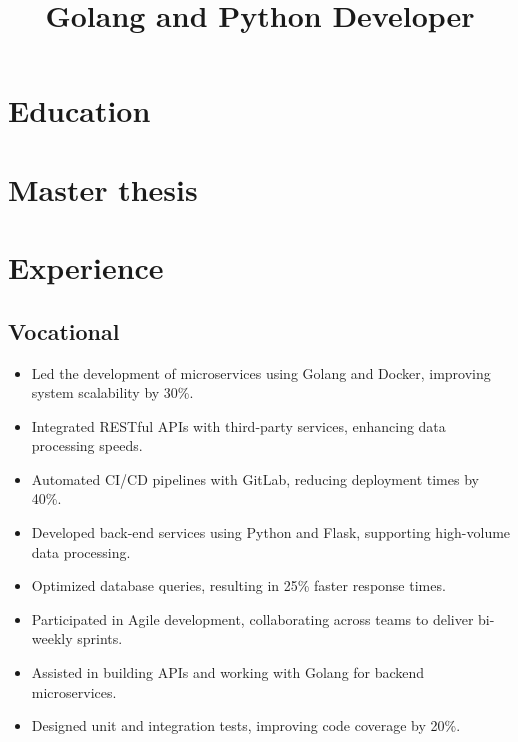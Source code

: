 \documentclass[11pt,a4paper,sans]{moderncv}
\title{Golang and Python Developer}
\begin{document}
\makecvtitle

\section{Education}

\section{Master thesis}

\section{Experience}
\subsection{Vocational}
{
\begin{itemize}
\item Led the development of microservices using Golang and Docker, improving system scalability by 30\%.
\item Integrated RESTful APIs with third-party services, enhancing data processing speeds.
\item Automated CI/CD pipelines with GitLab, reducing deployment times by 40\%.
\end{itemize}}

{
\begin{itemize}
\item Developed back-end services using Python and Flask, supporting high-volume data processing.
\item Optimized database queries, resulting in 25\% faster response times.
\item Participated in Agile development, collaborating across teams to deliver bi-weekly sprints.
\end{itemize}}

{
\begin{itemize}
\item Assisted in building APIs and working with Golang for backend microservices.
\item Designed unit and integration tests, improving code coverage by 20\%.
\end{itemize}}
\end{document}
